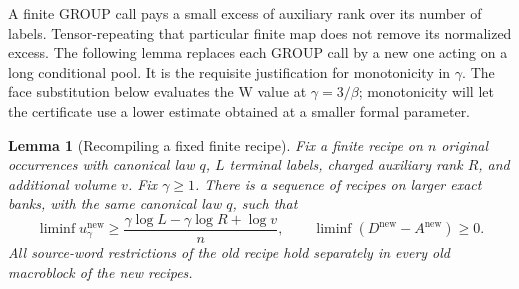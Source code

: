 \documentclass[11pt]{article}
\numberwithin{equation}{section}
\newtheorem{lemma}[theorem]{Lemma}
\theoremstyle{definition}
\theoremstyle{remark}
\begin{document}
A finite GROUP call pays a small excess of auxiliary rank over its number of
labels.  Tensor-repeating that particular finite map does not remove its
normalized excess.  The following lemma replaces each GROUP call by a new
one acting on a long conditional pool.  It is the requisite justification for
monotonicity in $\gamma$.  The face substitution below evaluates the W value
at $\gamma=3/\beta$; monotonicity will let the certificate use a lower
estimate obtained at a smaller formal parameter.

\begin{lemma}[Recompiling a fixed finite recipe]
\label{val:recompile}
Fix a finite recipe on $n$ original occurrences with canonical law $q$, $L$
terminal labels, charged auxiliary rank $R$, and additional volume $v$.
Fix $\gamma\ge1$.  There is a sequence of recipes on larger exact banks,
with the same canonical law $q$, such that
\begin{equation}
 \liminf u_\gamma^{\mathrm{new}}
 \ge \frac{\gamma\log L-\gamma\log R+\log v}{n},
 \qquad
 \liminf(D^{\mathrm{new}}-A^{\mathrm{new}})\ge0.
\label{val:recompile-goal}
\end{equation}
All source-word restrictions of the old recipe hold separately in every old
macroblock of the new recipes.
\end{lemma}
\end{document}
